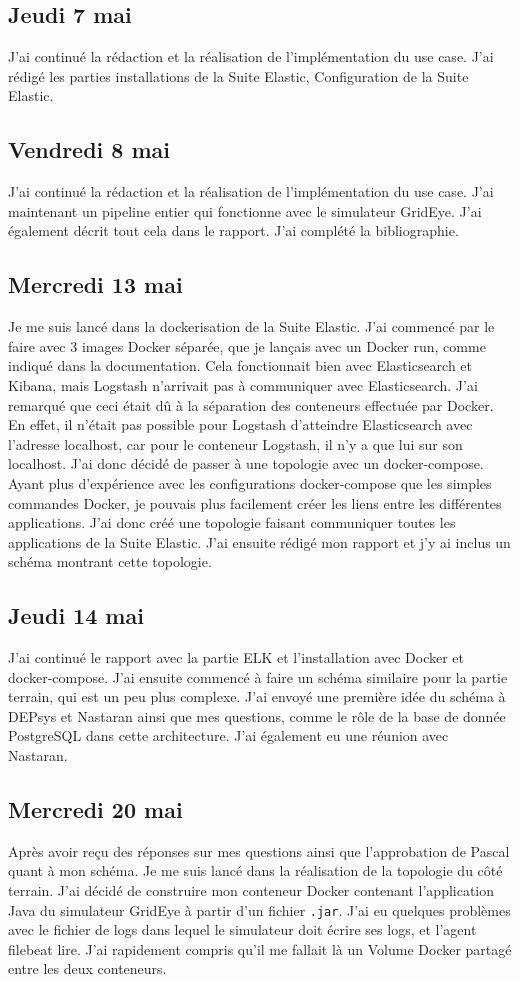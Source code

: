 \documentclass[paper=a4, fontsize=11pt]{scrartcl}
\begin{document}
\subsection{Jeudi 7 mai}
    J'ai continué la rédaction et la réalisation de l'implémentation du use case. J'ai rédigé les parties installations de la Suite Elastic, Configuration de la Suite Elastic.
\subsection{Vendredi 8 mai}
    J'ai continué la rédaction et la réalisation de l'implémentation du use case. J'ai maintenant un pipeline entier qui fonctionne avec le simulateur GridEye. J'ai également décrit tout cela dans le rapport. J'ai complété la bibliographie.
\subsection{Mercredi 13 mai}
    Je me suis lancé dans la dockerisation de la Suite Elastic. J'ai commencé par le faire avec 3 images Docker séparée, que je lançais avec un Docker run, comme indiqué dans la documentation. Cela fonctionnait bien avec Elasticsearch et Kibana, mais Logstash n'arrivait pas à communiquer avec Elasticsearch. J'ai remarqué que ceci était dû à la séparation des conteneurs effectuée par Docker. En effet, il n'était pas possible pour Logstash d'atteindre Elasticsearch avec l'adresse localhost, car pour le conteneur Logstash, il n'y a que lui sur \og son \fg localhost. J'ai donc décidé de passer à une topologie avec un docker-compose. Ayant plus d'expérience avec les configurations docker-compose que les simples commandes Docker, je pouvais plus facilement créer les liens entre les différentes applications. J'ai donc créé une topologie faisant communiquer toutes les applications de la Suite Elastic. J'ai ensuite rédigé mon rapport et j'y ai inclus un schéma montrant cette topologie.
\subsection{Jeudi 14 mai}
    J'ai continué le rapport avec la partie ELK et l'installation avec Docker et docker-compose. J'ai ensuite commencé à faire un schéma similaire pour la partie terrain, qui est un peu plus complexe. J'ai envoyé une première idée du schéma à DEPsys et Nastaran ainsi que mes questions, comme le rôle de la base de donnée PostgreSQL dans cette architecture. J'ai également eu une réunion avec Nastaran.
\subsection{Mercredi 20 mai}
    Après avoir reçu des réponses sur mes questions ainsi que l'approbation de Pascal quant à mon schéma. Je me suis lancé dans la réalisation de la topologie du côté terrain. J'ai décidé de construire mon conteneur Docker contenant l'application Java du simulateur GridEye à partir d'un fichier \verb,.jar,. J'ai eu quelques problèmes avec le fichier de logs dans lequel le simulateur doit écrire ses logs, et l'agent filebeat lire. J'ai rapidement compris qu'il me fallait là un Volume Docker partagé entre les deux conteneurs.
\end{document}
